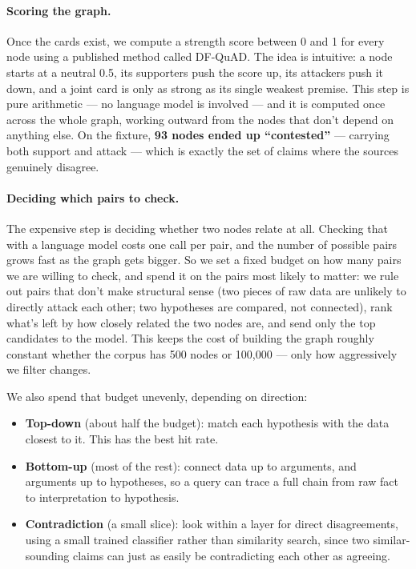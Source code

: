 \documentclass{article}
\begin{document}
\paragraph{Scoring the graph.}
Once the cards exist, we compute a strength score between 0 and 1 for every node
using a published method called DF-QuAD. The idea is intuitive: a node starts at
a neutral 0.5, its supporters push the score up, its attackers push it down, and
a joint card is only as strong as its single weakest premise. This step is pure
arithmetic --- no language model is involved --- and it is computed once across
the whole graph, working outward from the nodes that don't depend on anything
else. On the fixture, \textbf{93 nodes ended up ``contested''} --- carrying both
support and attack --- which is exactly the set of claims where the sources
genuinely disagree.

\paragraph{Deciding which pairs to check.}
The expensive step is deciding whether two nodes relate at all. Checking that
with a language model costs one call per pair, and the number of possible pairs
grows fast as the graph gets bigger. So we set a fixed budget on how many pairs
we are willing to check, and spend it on the pairs most likely to matter: we rule
out pairs that don't make structural sense (two pieces of raw data are unlikely
to directly attack each other; two hypotheses are compared, not connected), rank
what's left by how closely related the two nodes are, and send only the top
candidates to the model. This keeps the cost of building the graph roughly
constant whether the corpus has 500 nodes or 100{,}000 --- only how aggressively
we filter changes.

We also spend that budget unevenly, depending on direction:
\begin{itemize}
    \item \textbf{Top-down} (about half the budget): match each hypothesis with
        the data closest to it. This has the best hit rate.
    \item \textbf{Bottom-up} (most of the rest): connect data up to arguments,
        and arguments up to hypotheses, so a query can trace a full chain from
        raw fact to interpretation to hypothesis.
    \item \textbf{Contradiction} (a small slice): look within a layer for direct
        disagreements, using a small trained classifier rather than similarity
        search, since two similar-sounding claims can just as easily be
        contradicting each other as agreeing.
\end{itemize}
\end{document}
